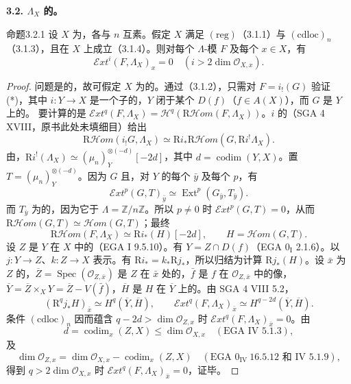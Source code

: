 \textbf{3.2. $\Lambda_X$ 的。}
\begin{SGAresult}{命题}{3.2.1}
设 $X$ 为，各与 $n$ 互素。假定 $X$ 满足 $(\mathrm{reg})$（3.1.1）与 $(\mathrm{cdloc})_n$（3.1.3），且在 $X$ 上成立（3.1.4）。则对每个 $\Lambda$-模 $F$ 及每个 $x\in X$，有
\[
\mathscr Ext^i(F,\Lambda_X)_x=0\quad(i>2\dim\mathscr O_{X,x}).\tag{*}
\]
\end{SGAresult}
\begin{proof}
问题是的，故可假定 $X$ 为的。通过（3.1.2），只需对 $F=i_!(G)$ 验证 (*)，其中 $i:Y\to X$ 是一个子的，$Y$ 闭于某个 $D(f)$（$f\in A(X)$），而 $G$ 是 $Y$ 上的。
要计算的是 $\mathscr Ext^q(F,\Lambda_X)=\mathscr H^q(\mathrm R\mathscr Hom(F,\Lambda_X))$。$i$ 的（SGA 4 XVIII，原书此处未填细目）给出
\[
\mathrm R\mathscr Hom(i_!G,\Lambda_X)\simeq\mathrm Ri_*\mathrm R\mathscr Hom(G,\mathrm Ri^!\Lambda_X).
\]
由，$\mathrm Ri^!(\Lambda_X)\simeq(\mu_n)_Y^{\otimes(-d)}[-2d]$，其中 $d=\operatorname{codim}(Y,X)$。置 $T=(\mu_n)_Y^{\otimes(-d)}$。因为 $G$ 且，对 $Y$ 的每个 $\bar y$ 及每个 $p$，有
\[
\mathscr Ext^p(G,T)_{\bar y}\simeq\operatorname{Ext}^p(G_{\bar y},T_{\bar y}).
\]
而 $T_{\bar y}$ 为的，因为它于 $\Lambda=\mathbb Z/n\mathbb Z$。所以 $p\ne0$ 时 $\mathscr Ext^p(G,T)=0$，从而 $\mathrm R\mathscr Hom(G,T)\simeq\mathscr Hom(G,T)$；最终
\[
\mathrm R\mathscr Hom(F,\Lambda_X)\simeq\mathrm Ri_*(H)[-2d],\qquad H=\mathscr Hom(G,T).
\]
设 $Z$ 是 $Y$ 在 $X$ 中的（EGA I 9.5.10）。有 $Y=Z\cap D(f)$（EGA $0_{\mathrm I}$ 2.1.6）。以 $j:Y\to Z$、$k:Z\to X$ 表示。有 $\mathrm Ri_*=k_*\mathrm Rj_*$，所以归结为计算 $\mathrm Rj_*(H)$。设 $\bar x$ 为 $Z$ 的，$\overline Z=\operatorname{Spec}(\mathscr O_{Z,\bar x})$ 是 $Z$ 在 $\bar x$ 处的，$\bar f$ 是 $f$ 在 $\mathscr O_{Z,\bar x}$ 中的像，$\overline Y=\overline Z\times_XY=\overline Z-V(\bar f)$，$\overline H$ 是 $H$ 在 $\overline Y$ 上的。由 SGA 4 VIII 5.2，
\[
(\mathrm R^qj_*H)_{\bar x}\simeq H^q(\overline Y,\overline H),\qquad
\mathscr Ext^q(F,\Lambda_X)_{\bar x}\simeq H^{q-2d}(\overline Y,\overline H).
\]
条件 $(\mathrm{cdloc})_n$ 因而蕴含 $q-2d>\dim\mathscr O_{Z,x}$ 时 $\mathscr Ext^q(F,\Lambda_X)_{\bar x}=0$。由
\[
d=\operatorname{codim}_x(Z,X)\leq\dim\mathscr O_{X,x}\quad(\text{EGA IV 5.1.3}),
\]
及
\[
\dim\mathscr O_{Z,x}=\dim\mathscr O_{X,x}-\operatorname{codim}_x(Z,X)
\quad(\text{EGA }0_{\mathrm{IV}}\ 16.5.12\text{ 和 IV 5.1.9}),
\]
得到 $q>2\dim\mathscr O_{X,x}$ 时 $\mathscr Ext^q(F,\Lambda_X)_{\bar x}=0$，证毕。
\end{proof}

